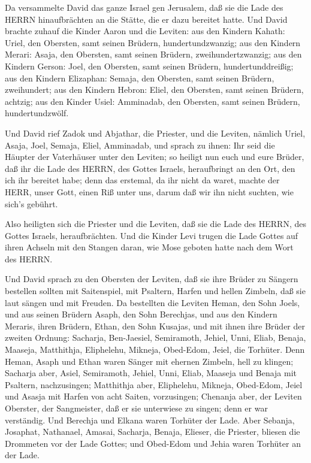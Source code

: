  Da versammelte David das ganze Israel gen Jerusalem, daß
sie die Lade des HERRN hinaufbrächten an die Stätte, die er dazu
bereitet hatte.  Und David brachte zuhauf die Kinder Aaron
und die Leviten:  aus den Kindern Kahath: Uriel, den
Obersten, samt seinen Brüdern, hundertundzwanzig;  aus den
Kindern Merari: Asaja, den Obersten, samt seinen Brüdern,
zweihundertzwanzig;  aus den Kindern Gerson: Joel, den
Obersten, samt seinen Brüdern, hundertunddreißig;  aus den
Kindern Elizaphan: Semaja, den Obersten, samt seinen Brüdern,
zweihundert;  aus den Kindern Hebron: Eliel, den Obersten,
samt seinen Brüdern, achtzig;  aus den Kinder Usiel:
Amminadab, den Obersten, samt seinen Brüdern, hundertundzwölf.

 Und David rief Zadok und Abjathar, die Priester, und die
Leviten, nämlich Uriel, Asaja, Joel, Semaja, Eliel, Amminadab,
 und sprach zu ihnen: Ihr seid die Häupter der Vaterhäuser
unter den Leviten; so heiligt nun euch und eure Brüder, daß ihr die Lade
des HERRN, des Gottes Israels, heraufbringt an den Ort, den ich ihr
bereitet habe;  denn das erstemal, da ihr nicht da waret,
machte der HERR, unser Gott, einen Riß unter uns, darum daß wir ihn
nicht suchten, wie sich's gebührt.

 Also heiligten sich die Priester und die Leviten, daß sie
die Lade des HERRN, des Gottes Israels, heraufbrächten. 
Und die Kinder Levi trugen die Lade Gottes auf ihren Achseln mit den
Stangen daran, wie Mose geboten hatte nach dem Wort des HERRN.

 Und David sprach zu den Obersten der Leviten, daß sie ihre
Brüder zu Sängern bestellen sollten mit Saitenspiel, mit Psaltern,
Harfen und hellen Zimbeln, daß sie laut sängen und mit Freuden.
 Da bestellten die Leviten Heman, den Sohn Joels, und aus
seinen Brüdern Asaph, den Sohn Berechjas, und aus den Kindern Meraris,
ihren Brüdern, Ethan, den Sohn Kusajas,  und mit ihnen ihre
Brüder der zweiten Ordnung: Sacharja, Ben-Jaesiel, Semiramoth, Jehiel,
Unni, Eliab, Benaja, Maaseja, Matthithja, Eliphelehu, Mikneja,
Obed-Edom, Jeiel, die Torhüter.  Denn Heman, Asaph und
Ethan waren Sänger mit ehernen Zimbeln, hell zu klingen; 
Sacharja aber, Asiel, Semiramoth, Jehiel, Unni, Eliab, Maaseja und
Benaja mit Psaltern, nachzusingen;  Matthithja aber,
Eliphelehu, Mikneja, Obed-Edom, Jeiel und Asasja mit Harfen von acht
Saiten, vorzusingen;  Chenanja aber, der Leviten Oberster,
der Sangmeister, daß er sie unterwiese zu singen; denn er war
verständig.  Und Berechja und Elkana waren Torhüter der
Lade.  Aber Sebanja, Josaphat, Nathanael, Amasai, Sacharja,
Benaja, Elieser, die Priester, bliesen die Drommeten vor der Lade
Gottes; und Obed-Edom und Jehia waren Torhüter an der Lade.

